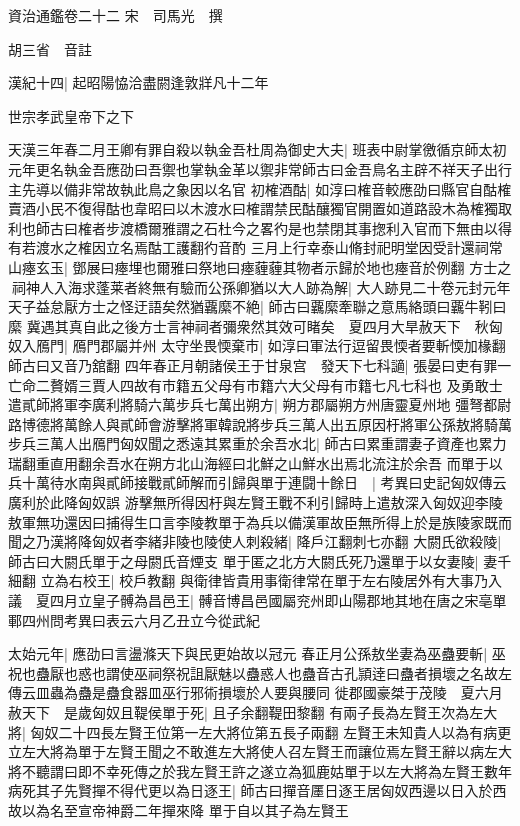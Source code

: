 資治通鑑卷二十二
宋　司馬光　撰

胡三省　音註

漢紀十四|{
	起昭陽恊洽盡閼逢敦牂凡十二年}


世宗孝武皇帝下之下

天漢三年春二月王卿有罪自殺以執金吾杜周為御史大夫|{
	班表中尉掌徼循京師太初元年更名執金吾應劭曰吾禦也掌執金革以禦非常師古曰金吾鳥名主辟不祥天子出行主先導以備非常故執此鳥之象因以名官}
初榷酒酤|{
	如淳曰榷音較應劭曰縣官自酤榷賣酒小民不復得酤也韋昭曰以木渡水曰榷謂禁民酤釀獨官開置如道路設木為榷獨取利也師古曰榷者步渡橋爾雅謂之石杜今之畧彴是也禁閉其事揔利入官而下無由以得有若渡水之榷因立名焉酤工護翻彴音酌}
三月上行幸泰山脩封祀明堂因受計還祠常山瘞玄玉|{
	鄧展曰瘞埋也爾雅曰祭地曰瘞薶薶其物者示歸於地也瘞音於例翻}
方士之祠神人入海求蓬莱者終無有驗而公孫卿猶以大人跡為解|{
	大人跡見二十卷元封元年}
天子益怠厭方士之怪迂語矣然猶覊縻不絶|{
	師古曰覊縻牽聯之意馬絡頭曰覊牛靷曰縻}
冀遇其真自此之後方士言神祠者彌衆然其效可睹矣　夏四月大旱赦天下　秋匈奴入鴈門|{
	鴈門郡屬并州}
太守坐畏愞棄市|{
	如淳曰軍法行逗留畏愞者要斬愞加椽翻師古曰又音乃舘翻}
四年春正月朝諸侯王于甘泉宫　發天下七科讁|{
	張晏曰吏有罪一亡命二贅婿三賈人四故有市籍五父母有市籍六大父母有市籍七凡七科也}
及勇敢士遣貳師將軍李廣利將騎六萬步兵七萬出朔方|{
	朔方郡屬朔方州唐靈夏州地}
彊弩都尉路博德將萬餘人與貳師會游擊將軍韓說將步兵三萬人出五原因杅將軍公孫敖將騎萬步兵三萬人出鴈門匈奴聞之悉遠其累重於余吾水北|{
	師古曰累重謂妻子資產也累力瑞翻重直用翻余吾水在朔方北山海經曰北鮮之山鮮水出焉北流注於余吾}
而單于以兵十萬待水南與貳師接戰貳師解而引歸與單于連闘十餘日　|{
	考異曰史記匈奴傳云廣利於此降匈奴誤}
游擊無所得因杅與左賢王戰不利引歸時上遣敖深入匈奴迎李陵敖軍無功還因曰捕得生口言李陵教單于為兵以備漢軍故臣無所得上於是族陵家既而聞之乃漢將降匈奴者李緒非陵也陵使人刺殺緒|{
	降戶江翻刺七亦翻}
大閼氏欲殺陵|{
	師古曰大閼氏單于之母閼氏音煙支}
單于匿之北方大閼氏死乃還單于以女妻陵|{
	妻千細翻}
立為右校王|{
	校戶教翻}
與衛律皆貴用事衛律常在單于左右陵居外有大事乃入議　夏四月立皇子髆為昌邑王|{
	髆音博昌邑國屬兖州即山陽郡地其地在唐之宋亳單鄆四州問考異曰表云六月乙丑立今從武紀}


太始元年|{
	應劭曰言盪滌天下與民更始故以冠元}
春正月公孫敖坐妻為巫蠱要斬|{
	巫祝也蠱厭也惑也謂使巫祠祭祝詛厭魅以蠱惑人也蠱音古孔頴逹曰蠱者損壞之名故左傳云皿蟲為蠱是蠱食器皿巫行邪術損壞於人要與腰同}
徙郡國豪桀于茂陵　夏六月赦天下　是歲匈奴且鞮侯單于死|{
	且子余翻鞮田黎翻}
有兩子長為左賢王次為左大將|{
	匈奴二十四長左賢王位第一左大將位第五長子兩翻}
左賢王未知貴人以為有病更立左大將為單于左賢王聞之不敢進左大將使人召左賢王而讓位焉左賢王辭以病左大將不聽謂曰即不幸死傳之於我左賢王許之遂立為狐鹿姑單于以左大將為左賢王數年病死其子先賢撣不得代更以為日逐王|{
	師古曰撣音㕓日逐王居匈奴西邊以日入於西故以為名至宣帝神爵二年撣來降}
單于自以其子為左賢王

